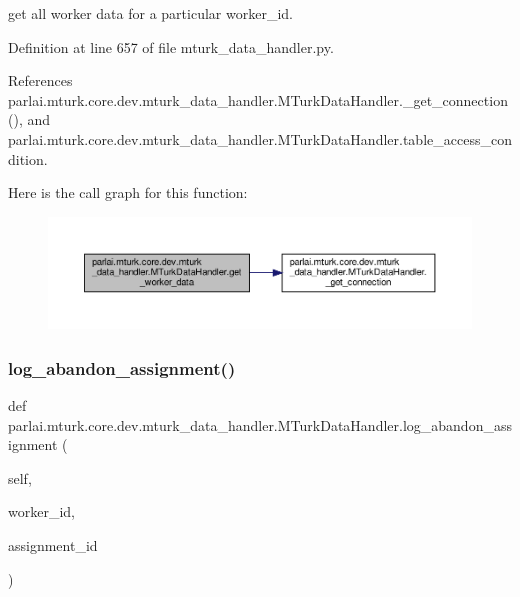 \begin{DoxyVerb}get all worker data for a particular worker_id.\end{DoxyVerb}
 

Definition at line 657 of file mturk\+\_\+data\+\_\+handler.\+py.



References parlai.\+mturk.\+core.\+dev.\+mturk\+\_\+data\+\_\+handler.\+M\+Turk\+Data\+Handler.\+\_\+get\+\_\+connection(), and parlai.\+mturk.\+core.\+dev.\+mturk\+\_\+data\+\_\+handler.\+M\+Turk\+Data\+Handler.\+table\+\_\+access\+\_\+condition.

Here is the call graph for this function\+:
\nopagebreak
\begin{figure}[H]
\begin{center}
\leavevmode
\includegraphics[width=350pt]{classparlai_1_1mturk_1_1core_1_1dev_1_1mturk__data__handler_1_1MTurkDataHandler_a748e6271a1618272cd17ec412b2c2a25_cgraph}
\end{center}
\end{figure}
\mbox{\label{classparlai_1_1mturk_1_1core_1_1dev_1_1mturk__data__handler_1_1MTurkDataHandler_a6f53c1208c4e3b71be96c4f3e96dab2e}} 
\subsubsection{\texorpdfstring{log\+\_\+abandon\+\_\+assignment()}{log\_abandon\_assignment()}}
{\footnotesize\ttfamily def parlai.\+mturk.\+core.\+dev.\+mturk\+\_\+data\+\_\+handler.\+M\+Turk\+Data\+Handler.\+log\+\_\+abandon\+\_\+assignment (\begin{DoxyParamCaption}\item[{}]{self,  }\item[{}]{worker\+\_\+id,  }\item[{}]{assignment\+\_\+id }\end{DoxyParamCaption})}

